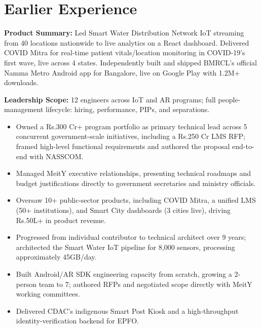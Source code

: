 \section{Earlier Experience}
\textbf{Product Summary:} Led Smart Water Distribution Network IoT streaming from 40 locations nationwide to live analytics on a React dashboard. Delivered COVID Mitra for real-time patient vitals/location monitoring in COVID-19's first wave, live across 4 states. Independently built and shipped BMRCL's official Namma Metro Android app for Bangalore, live on Google Play with 1.2M+ downloads.\par
\textbf{Leadership Scope:} 12 engineers across IoT and AR programs; full people-management lifecycle: hiring, performance, PIPs, and separations.\par
{}
\begin{itemize}
\item Owned a Rs.300 Cr+ program portfolio as primary technical lead across 5 concurrent government-scale initiatives, including a Rs.250 Cr LMS RFP; framed high-level functional requirements and authored the proposal end-to-end with NASSCOM.
\item Managed MeitY executive relationships, presenting technical roadmaps and budget justifications directly to government secretaries and ministry officials.
\item Oversaw 10+ public-sector products, including COVID Mitra, a unified LMS (50+ institutions), and Smart City dashboards (3 cities live), driving Rs.50L+ in product revenue.
\end{itemize}
\begin{itemize}
\item Progressed from individual contributor to technical architect over 9 years; architected the Smart Water IoT pipeline for 8,000 sensors, processing approximately 45GB/day.
\item Built Android/AR SDK engineering capacity from scratch, growing a 2-person team to 7; authored RFPs and negotiated scope directly with MeitY working committees.
\item Delivered CDAC's indigenous Smart Post Kiosk and a high-throughput identity-verification backend for EPFO.
\end{itemize}
